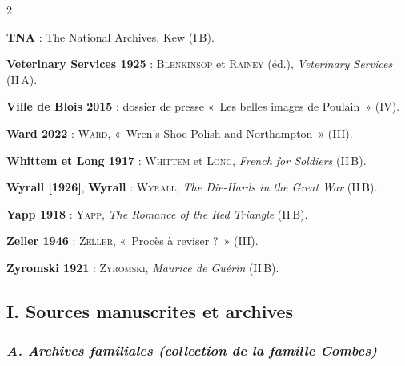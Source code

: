 \begin{multicols}{2}
\begin{biblist}
\item \textbf{TNA} : The National Archives, Kew (I\,B).
\item \textbf{Veterinary Services 1925} : \textsc{Blenkinsop} et \textsc{Rainey} (éd.), \textit{Veterinary Services} (II\,A).
\item \textbf{Ville de Blois 2015} : dossier de presse «~Les belles images de Poulain~» (IV).
\item \textbf{Ward 2022} : \textsc{Ward}, «~Wren's Shoe Polish and Northampton~» (III).
\item \textbf{Whittem et Long 1917} : \textsc{Whittem} et \textsc{Long}, \textit{French for Soldiers} (II\,B).
\item \textbf{Wyrall [1926]}, \textbf{Wyrall} : \textsc{Wyrall}, \textit{The Die-Hards in the Great War} (II\,B).
\item \textbf{Yapp 1918} : \textsc{Yapp}, \textit{The Romance of the Red Triangle} (II\,B).
\item \textbf{Zeller 1946} : \textsc{Zeller}, «~Procès à reviser ?~» (III).
\item \textbf{Zyromski 1921} : \textsc{Zyromski}, \textit{Maurice de Guérin} (II\,B).
\end{biblist}
\end{multicols}

\subsection*{\normalsize\upshape\bfseries I. Sources manuscrites et archives}

\subsubsection*{\normalsize\mdseries\itshape A. Archives familiales (collection de la famille Combes)}

